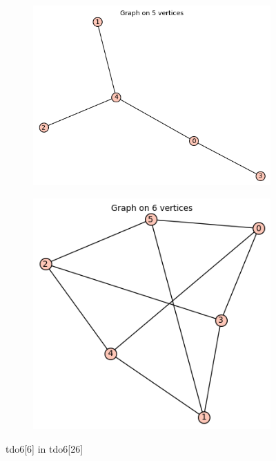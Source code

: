 \documentclass[12pt, a4paper]{article}
\begin{document}
\begin{center}
\begin{figure}[!htb]
\centering
\begin{subfigure}{0.5\textwidth}
  \centering
  \includegraphics[width=0.5\linewidth]{tdo6[6]}
\end{subfigure}%
\begin{subfigure}{0.5\textwidth}
  \centering
  \includegraphics[width=0.5\linewidth]{tdo6[26]}
\end{subfigure}
\caption{tdo6[6] in tdo6[26]}
\label{fig:test}
\end{figure}


\end{center}
\end{document}
